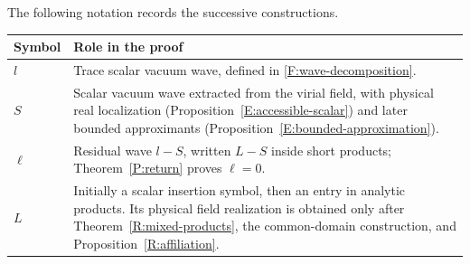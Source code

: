 The following notation records the successive constructions.
\begin{center}
\small
\begin{tabular}{@{}p{}p{}@{}}
\toprule
Symbol & Role in the proof\\
\midrule
$l$ & Trace scalar vacuum wave, defined in \eqref{F:wave-decomposition}.\\
$S$ & Scalar vacuum wave extracted from the virial field, with physical real localization (Proposition~\ref{E:accessible-scalar}) and later bounded approximants (Proposition~\ref{E:bounded-approximation}).\\
$\ell$ & Residual wave $l-S$, written $L-S$ inside short products; Theorem~\ref{P:return} proves $\ell=0$.\\
$L$ & Initially a scalar insertion symbol, then an entry in analytic products. Its physical field realization is obtained only after Theorem~\ref{R:mixed-products}, the common-domain construction, and Proposition~\ref{R:affiliation}.\\
\bottomrule
\end{tabular}
\end{center}

